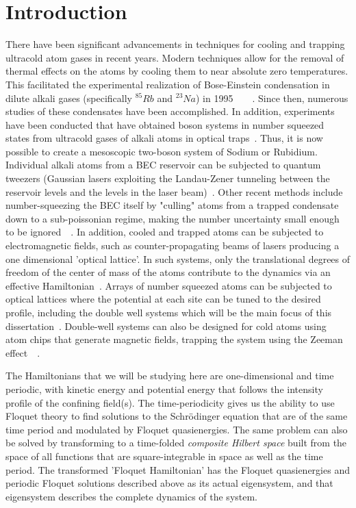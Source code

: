 \chapter{Introduction}
%
\label{chapter-intro}
There have been significant advancements in  techniques for cooling and trapping ultracold atom gases in recent years. Modern techniques allow for the removal of thermal effects on the atoms by cooling them to near absolute zero temperatures. This facilitated the experimental realization of Bose-Einstein condensation in  dilute alkali gases (specifically $^{85}Rb$ and $^{23}Na$) in 1995~\cite{weiman}~\cite{weiman:cornell}~\cite{ketterle}~\cite{ketterle2}. Since then, numerous studies of these condensates have been accomplished. In addition, experiments have been conducted that have obtained boson systems in number squeezed states from ultracold gases of alkali atoms in optical traps~\cite{raizen}. Thus, it is now possible to create a mesoscopic two-boson system of Sodium or Rubidium. Individual alkali atoms from a BEC reservoir can be subjected to quantum tweezers (Gaussian lasers exploiting the Landau-Zener tunneling between the reservoir levels and the levels in the laser beam)~\cite{diener}. Other recent methods include number-squeezing the BEC itself by "culling" atoms from a trapped condensate down to a sub-poissonian regime, making the number uncertainty small enough to be ignored~\cite{raizen}~\cite{Dudarev:Raizen:Niu}. In addition, cooled and trapped atoms can be subjected to electromagnetic fields, such as counter-propagating beams of lasers producing a one dimensional 'optical lattice'. In such systems, only the translational degrees of freedom of the center of mass of the atoms contribute to the dynamics via an effective Hamiltonian~\cite{graham}. Arrays of number squeezed atoms can be subjected to optical lattices where  the potential at each site can be tuned to the desired profile, including the double well systems which will be the main focus of this dissertation~\cite{Deutsch:Jessen}. Double-well systems can also be designed for cold atoms using atom chips that generate magnetic fields, trapping the system using the Zeeman effect~\cite{doublewell:chip}~\cite{doublewell:chip:nature}.

The Hamiltonians that we will be studying here are one-dimensional and time periodic, with kinetic energy and potential energy that follows the intensity profile of the confining field(s). The time-periodicity gives us the ability to use Floquet theory to find solutions to the Schr\"odinger equation that are of the same time period and modulated by Floquet quasienergies. The same problem can also be solved by transforming to a time-folded \textit{composite Hilbert space} built from the space of all functions that are square-integrable in space as well as the time period. The transformed 'Floquet Hamiltonian' has the Floquet quasienergies and periodic Floquet solutions described above as its actual eigensystem, and that eigensystem describes the complete dynamics of the system.

